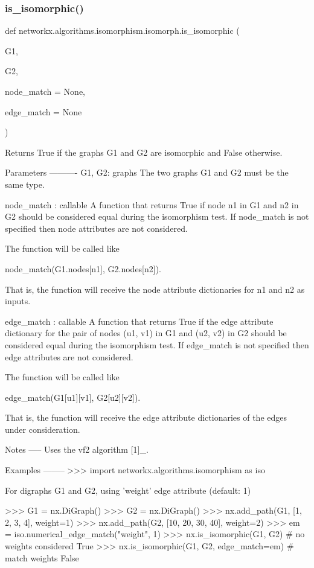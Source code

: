 \subsubsection{\texorpdfstring{is\+\_\+isomorphic()}{is\_isomorphic()}}
{\footnotesize\ttfamily def networkx.\+algorithms.\+isomorphism.\+isomorph.\+is\+\_\+isomorphic (\begin{DoxyParamCaption}\item[{}]{G1,  }\item[{}]{G2,  }\item[{}]{node\+\_\+match = {\ttfamily None},  }\item[{}]{edge\+\_\+match = {\ttfamily None} }\end{DoxyParamCaption})}

\begin{DoxyVerb}Returns True if the graphs G1 and G2 are isomorphic and False otherwise.

Parameters
----------
G1, G2: graphs
    The two graphs G1 and G2 must be the same type.

node_match : callable
    A function that returns True if node n1 in G1 and n2 in G2 should
    be considered equal during the isomorphism test.
    If node_match is not specified then node attributes are not considered.

    The function will be called like

       node_match(G1.nodes[n1], G2.nodes[n2]).

    That is, the function will receive the node attribute dictionaries
    for n1 and n2 as inputs.

edge_match : callable
    A function that returns True if the edge attribute dictionary
    for the pair of nodes (u1, v1) in G1 and (u2, v2) in G2 should
    be considered equal during the isomorphism test.  If edge_match is
    not specified then edge attributes are not considered.

    The function will be called like

       edge_match(G1[u1][v1], G2[u2][v2]).

    That is, the function will receive the edge attribute dictionaries
    of the edges under consideration.

Notes
-----
Uses the vf2 algorithm [1]_.

Examples
--------
>>> import networkx.algorithms.isomorphism as iso

For digraphs G1 and G2, using 'weight' edge attribute (default: 1)

>>> G1 = nx.DiGraph()
>>> G2 = nx.DiGraph()
>>> nx.add_path(G1, [1, 2, 3, 4], weight=1)
>>> nx.add_path(G2, [10, 20, 30, 40], weight=2)
>>> em = iso.numerical_edge_match("weight", 1)
>>> nx.is_isomorphic(G1, G2)  # no weights considered
True
>>> nx.is_isomorphic(G1, G2, edge_match=em)  # match weights
False


\end{DoxyVerb}
